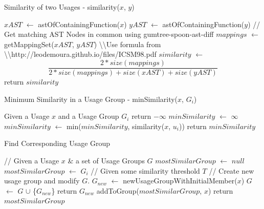 \documentclass[conference]{IEEEtran}
\begin{document}
\begin{algorithm}
    \caption{Similarity of two Usages - similarity($x$, $y$)} 
    \begin{algorithmic}[1]
    \State $xAST$  $\leftarrow$ astOfContainingFunction($x$)
    \State $yAST$ $\leftarrow$ astOfContainingFunction($y$)
    \State // Get matching AST Nodes in common using gumtree-spoon-ast-diff
    \State $mappings$ $\leftarrow$ getMappingSet($xAST$, $yAST$)
    \State 
    \textbackslash \textbackslash  Use formula from     
    \State 
    \textbackslash \textbackslash http://leodemoura.github.io/files/ICSM98.pdf
    \State $similarity$ $\leftarrow$
    $$\frac
    {2*size(mappings)}
    {2*size(mappings) + size(xAST) + size(yAST)}$$
    \State return $similarity$
    \end{algorithmic} 
\end{algorithm}
\begin{algorithm}
    \caption{Minimum Similarity in a Usage Group - minSimilarity($x$, $G_{i}$)} 
    \begin{algorithmic}[1]
    \State Given a Usage $x$ and a Usage Group $G_{i}$
    \State return  $-\infty$
    \EndIf
    \State $minSimilarity$ $\leftarrow$ $\infty$
    \State $minSimilarity$ $\leftarrow$ min($minSimilarity$, similarity($x$, $u_{i}$))
    \EndFor
    \State return $minSimilarity$
    \end{algorithmic} 
\end{algorithm}


\begin{algorithm}
    \caption{Find Corresponding Usage Group} 
    \begin{algorithmic}[1]
    \State // Given a Usage $x$ \& a set of Usage Groups $G$
    \State $mostSimilarGroup$ $\leftarrow$ $null$
    \State $mostSimilarGroup$ $\leftarrow$ $G_{i}$
    \EndIf
    \EndFor
    \State // Given some similarity threshold $T$
        \State // Create new usage group and modify $G$.
        \State $G_{new}$ $\leftarrow$ newUsageGroupWithInitialMember($x$)
        \State $G$ $\leftarrow$ $G$ $\cup$ \{$G_{new}$\}
        \State return $G_{new}$
    \EndIf
    \State addToGroup($mostSimilarGroup$, $x$)
    \State return $mostSimilarGroup$
    \end{algorithmic} 
\end{algorithm}
\end{document}
